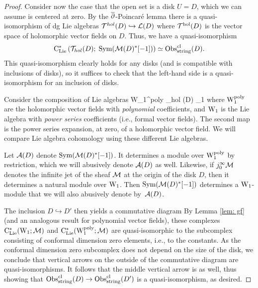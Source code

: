 \begin{proof}
Consider now the case that the open set is a disk $U = D$, which we can assume is centered at zero. 
By the $\overline{\partial}$-Poincar\'{e} lemma 
there is a quasi-isomorphism of dg Lie algebras $\mathcal T^{hol}(D) \hookrightarrow \mathcal L(D)$ where $\mathcal T^{\rm hol}(D)$ is the vector space of holomorphic vector fields on $D$. 
Thus, we have a quasi-isomorphism
\[
{\rm C}_{{\rm Lie}}^*\left(\mathcal T_{hol}(D) ; \; {\rm Sym}(\mathcal M(D)^*[-1])\right) \simeq {\rm Obs}^{{\rm cl}}_{\rm string}(D).
\]
This quasi-isomorphism clearly holds for any disks (and is compatible with inclusions of disks), so it suffices to check that the left-hand side is a quasi-isomorphism for an inclusion of disks.

Consider the composition of Lie algebras
\ben
{\rm W}_1^{\rm poly} \hookrightarrow \cT_{hol} (D) _1
\een
where ${\rm W}_1^{\rm poly}$ are the holomorphic vector fields with {\em polynomial} coefficients, and ${\rm W}_1$ is the Lie algebra with {\em power series} coefficients (i.e., formal vector fields).
The second map is the power series expansion, at zero, of a holomorphic vector field. 
We will compare Lie algebra cohomology using these different Lie algebras.

Let $\mathcal{A}(D)$ denote ${\rm Sym}(\mathcal M(D)^*[-1])$.
It determines a module over ${\rm W}_1^{\rm poly}$ by restriction,
which we will abusively denote $\mathcal{A}(D)$ as well.
Likewise, if $j_0^\infty \mathcal M$ denotes the infinite jet of the sheaf $\mathcal M$ at the origin of the disk $D$,
then it determines a natural module over ${\rm W}_1$.
Then ${\rm Sym}(\mathcal M(D)^*[-1])$ determines a ${\rm W}_1$-module that we will also abusively denote by~$\mathcal{A}(D)$.
 
The inclusion $D \hookrightarrow D'$ then yields a commutative diagram
\ben
{}
\een
By Lemma \ref{lem: gf} (and an analogous result for polynomial vector fields),
these complexes ${\rm C}_{{\rm Lie}}^*({\rm W}_1 ; \mathcal M)$ and ${\rm C}_{{\rm Lie}}^*({\rm W}^{\rm poly}_1; \mathcal M)$ are quasi-isomorphic to the subcomplex consisting of conformal dimension zero elements, 
i.e., to the constants. 
As the conformal dimension zero subcomplex does not depend on the size of the disk, we conclude that vertical arrows on the outside of the commutative diagram are quasi-isomorphisms. 
It follows that the middle vertical arrow is as well, 
thus showing that ${\rm Obs}^{{\rm cl}}_{\rm string}(D) \to {\rm Obs}^{{\rm cl}}_{\rm string}(D')$ is a quasi-isomorphism, as desired. 


\end{proof}
